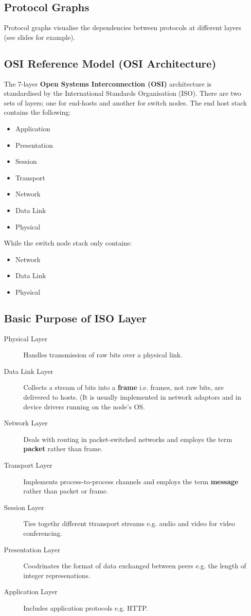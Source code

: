 \documentclass{article}%
\begin{document}
\subsection{Protocol Graphs}
\label{sec:org2f7025e}
Protocol graphs visualise the dependencies between protocols at different layers (see slides for example).

\subsection{OSI Reference Model (OSI Architecture)}
\label{sec:orge552cb3}
The 7-layer \textbf{Open Systems Interconnection (OSI)} architecture is standardised by the International Standards Organisation (ISO).
There are two sets of layers; one for end-hosts and another for switch nodes.
The end host stack contains the following:
\begin{itemize}
\item Application
\item Presentation
\item Session
\item Transport
\item Network
\item Data Link
\item Physical
\end{itemize}
While the switch node stack only contains:
\begin{itemize}
\item Network
\item Data Link
\item Physical
\end{itemize}

\subsection{Basic Purpose of ISO Layer}
\label{sec:org7ebcd69}
\begin{description}
\item[{Physical Layer}] Handles transmission of raw bits over a physical link.
\item[{Data Link Layer}] Collects a stream of bits into a \textbf{frame} i.e. frames, not raw bits, are delivered to hosts. (It is usually implemented in network adaptors and in device drivers running on the node's OS.
\item[{Network Layer}] Deals with routing in packet-switched networks and employs the term \textbf{packet} rather than frame.
\item[{Transport Layer}] Implements process-to-process channels and employs the term \textbf{message} rather than packet or frame.
\item[{Session Layer}] Ties togethr different ttransport streams e.g. audio and video for video conferencing.
\item[{Presentation Layer}] Coodrinates the format of data exchanged between peers e.g. the length of integer represenations.
\item[{Application Layer}] Includes application protocols e.g. HTTP.
\end{description}
\end{document}
